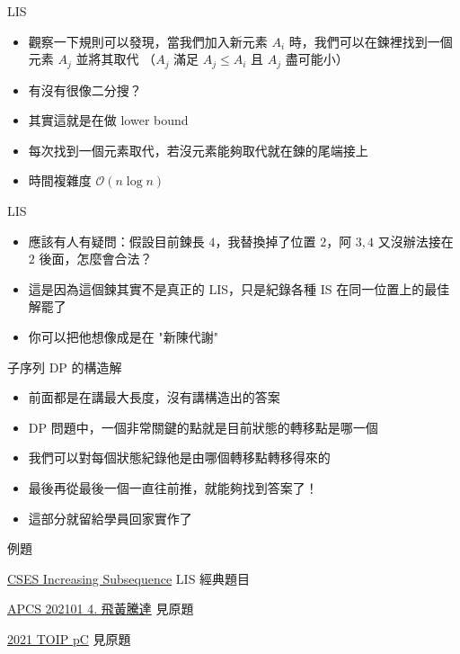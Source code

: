 \documentclass[aspectratio=169]{beamer}
\begin{document}
    \begin{frame}{LIS}
        \begin{itemize}
            \item<1-> 觀察一下規則可以發現，當我們加入新元素 $A_i$ 時，我們可以在鍊裡找到一個元素 $A_j$ 並將其取代 （$A_j$ 滿足 $A_j \le A_i$ 且 $A_j$ 盡可能小）
            \item<2-> 有沒有很像二分搜？
            \item<3-> 其實這就是在做 lower bound
            \item<4-> 每次找到一個元素取代，若沒元素能夠取代就在鍊的尾端接上
            \item<5-> 時間複雜度 $\mathcal{O}(n\log{n})$
        \end{itemize}
    \end{frame}

    \begin{frame}{LIS}
        \begin{itemize}
            \item<1-> 應該有人有疑問：假設目前鍊長 $4$，我替換掉了位置 $2$，阿 $3, 4$ 又沒辦法接在 $2$ 後面，怎麼會合法？
            \item<2-> 這是因為這個鍊其實不是真正的 LIS，只是紀錄各種 IS 在同一位置上的最佳解罷了
            \item<3-> 你可以把他想像成是在 "新陳代謝"
        \end{itemize}
    \end{frame}

    \begin{frame}{子序列 DP 的構造解}
        \begin{itemize}
            \item<1-> 前面都是在講最大長度，沒有講構造出的答案
            \item<2-> DP 問題中，一個非常關鍵的點就是目前狀態的轉移點是哪一個
            \item<3-> 我們可以對每個狀態紀錄他是由哪個轉移點轉移得來的
            \item<3-> 最後再從最後一個一直往前推，就能夠找到答案了！
            \item<3-> 這部分就留給學員回家實作了
        \end{itemize}
    \end{frame}
    
    \begin{frame}{例題}
        \begin{block}{\href{https://cses.fi/problemset/task/1145}{CSES Increasing Subsequence}}
            LIS 經典題目
        \end{block}

        \begin{block}{\href{https://zerojudge.tw/ShowProblem?problemid=f608}{APCS 202101 4. 飛黃騰達}}
            見原題
        \end{block}

        \begin{block}{\href{https://tioj.ck.tp.edu.tw/problems/2195}{2021 TOIP pC}}
            見原題
        \end{block}
    \end{frame}
\end{document}

